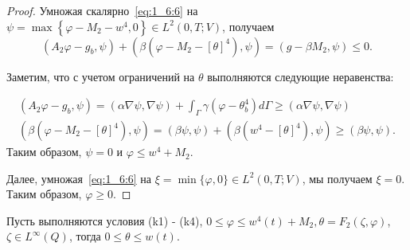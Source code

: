 \begin{proof}
    Умножая скалярно~\eqref{eq:1_6:6} на
    $\psi=\max \left\{\varphi-M_{2}-w^{4}, 0\right\} \in L^{2}(0, T ; V)$,
    получаем
    \[
        \left(A_{2} \varphi-g_{b}, \psi\right)+\left(\beta\left(\varphi-M_{2}
        -[\theta]^{4}\right), \psi\right)=\left(g-\beta M_{2}, \psi\right) \leq 0.
    \]

    Заметим, что с учетом ограничений на $\theta$ выполняются следующие неравенства:

    \[
        \begin{gathered}
            \left(A_{2} \varphi-g_{b}, \psi\right)=(\alpha \nabla \psi, \nabla \psi)+\int_{\Gamma}
            \gamma\left(\varphi-\theta_{b}^{4}\right) d \Gamma \geq(\alpha \nabla \psi, \nabla \psi) \\
            \left(\beta\left(\varphi-M_{2}-[\theta]^{4}\right),
            \psi\right)=(\beta \psi, \psi)+\left(\beta\left(w^{4}
            -[\theta]^{4}\right), \psi\right) \geq(\beta \psi, \psi).
        \end{gathered}
    \]
    Таким образом, $\psi=0$ и $\varphi \leq w^{4}+M_{2}$.

    Далее, умножая~\eqref{eq:1_6:6} на $\xi=\min \{\varphi, 0\} \in L^{2}(0, T ; V)$,
    мы получаем $\xi=0$.
    Таким образом, $\varphi \geq 0$.
\end{proof}

\begin{lemma}
    \label{lm:1_6:2}
    Пусть выполняются условия (k1) - (k4),
    $0 \leq \varphi \leq w^{4}(t)+M_{2}, \theta=F_{2}(\zeta, \varphi)$,
    $\zeta \in L^{\infty}(Q)$, тогда $0 \leq \theta \leq w(t)$.
\end{lemma}

